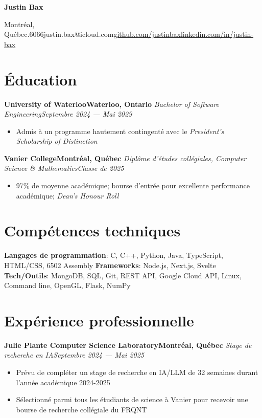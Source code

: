 \documentclass{article}
\newcommand{\cdelim}{\;\textbar\;}
\newcommand{\newrole}[4]{
    {\normalfont\bfseries #1\hfill#3}
    \newline
    \textit{#2}\hfill\textit{#4}
}
\newenvironment{bulletpoints}{\vspace*{-0.2em}\begin{itemize}\setlength\itemsep{-0.3em}}{\end{itemize}}
\begin{document}
\begin{center}
    {\Huge\bfseries Justin Bax}\\\vspace*{2pt}

    Montréal, Québec\cdelim 438.763.6066\cdelim justin.bax@icloud.com\cdelim\href{https://github.com/justinbax}{github.com/justinbax}\cdelim\href{https://linkedin.com/in/justin-bax}{linkedin.com/in/justin-bax}\\
\end{center}

\section*{Éducation}

\newrole{University of Waterloo}{Bachelor of Software Engineering}{Waterloo, Ontario}{Septembre 2024 --- Mai 2029}
\begin{bulletpoints}
    \item Admis à un programme hautement contingenté avec le \emph{President's Scholarship of Distinction}
\end{bulletpoints}

\newrole{Vanier College}{Diplôme d'études collégiales, Computer Science \& Mathematics}{Montréal, Québec}{Classe de 2025}
\begin{bulletpoints}
    \item 97\% de moyenne académique; bourse d'entrée pour excellente performance académique; \textit{Dean's Honour Roll} 
\end{bulletpoints}


\section*{Compétences techniques}

{\bfseries Langages de programmation}: C, C++, Python, Java, TypeScript, HTML/CSS, 6502 Assembly
\newline
{\bfseries Frameworks}: Node.js, Next.js, Svelte
\newline
{\bfseries Tech/Outils}: MongoDB, SQL, Git, REST API, Google Cloud API, Linux, Command line, OpenGL, Flask, NumPy


\section*{Expérience professionnelle}

\newrole{Julie Plante Computer Science Laboratory}{Stage de recherche en IA}{Montréal, Québec}{Septembre 2024 --- Mai 2025}
\begin{bulletpoints}
    \item Prévu de compléter un stage de recherche en IA/LLM de 32 semaines durant l’année académique 2024-2025
    \item Sélectionné parmi tous les étudiants de science à Vanier pour recevoir une bourse de recherche collégiale du FRQNT
\end{bulletpoints}
\end{document}
